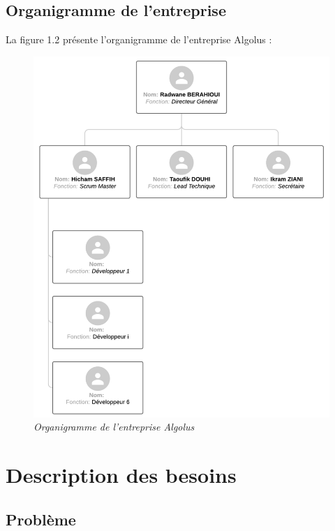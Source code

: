 \documentclass[12pt,a4paper]{report}
\begin{document}
	\subsection{Organigramme de l’entreprise}
	
	La figure 1.2 présente l'organigramme de l'entreprise Algolus :
	
	\begin{figure}[H]
		\centering
		\includegraphics[width=1\textwidth]{algolus-organigramme.png}
		\caption{\textit{Organigramme de l'entreprise Algolus}}
		\label{fig:algolus-organigramme}
	\end{figure}
	
	\section{Description des besoins}
	
	\subsection{Problème}
	
\end{document}
